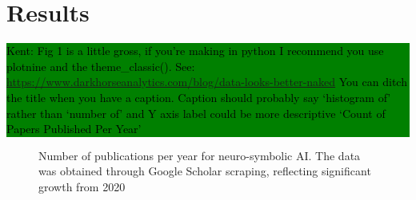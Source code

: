 \documentclass[hf]{ceurart}
\newcommand{\pinaforecomment}[4]{\colorbox{#1}{\textcolor{#4}{\parbox{.8\linewidth}{#2: #3}}}}
\newcommand{\osullikomment}[1]{\pinaforecomment{green}{Kent}{#1}{black}}
\begin{document}
\section{Results}\label{sec:results}

\osullikomment{Fig 1 is a little gross, if you're making in python I recommend you use plotnine and the theme\_classic(). See: \url{https://www.darkhorseanalytics.com/blog/data-looks-better-naked} You can ditch the title when you have a caption. Caption should probably say `histogram of' rather than `number of' and Y axis label could be more descriptive `Count of Papers Published Per Year'}

\begin{figure}[ht]
    \centering
   
    \caption{Number of publications per year for neuro-symbolic AI. The data was obtained through Google Scholar scraping, reflecting significant growth from 2020}
    \label{fig:pubs_by_year}
\end{figure}
\end{document}
